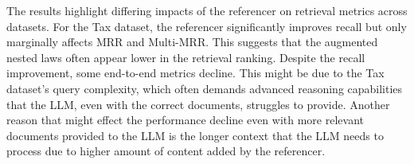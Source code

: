 



The results highlight differing impacts of the referencer on retrieval metrics across datasets. For the Tax dataset, the referencer significantly improves recall but only marginally affects MRR and Multi-MRR. This suggests that the augmented nested laws often appear lower in the retrieval ranking. Despite the recall improvement, some end-to-end metrics decline. This might be due to the Tax dataset's query complexity, which often demands advanced reasoning capabilities that the LLM, even with the correct documents, struggles to provide. Another reason that might effect the performance decline even with more relevant documents provided to the LLM is the longer context that the LLM needs to process due to higher amount of content added by the referencer.


